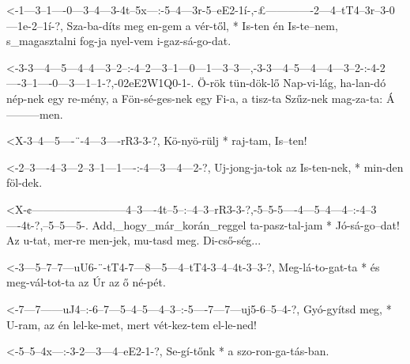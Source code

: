   {<-1---3--1----0---3--4---3-4t--5x---:-5--4---3r-5--eE2-1í-,-£-------------2---4--tT4--3r--3-0---1e-2--1í-?,}
  {  Sza-ba-díts meg en-gem a vér-től, * Is-ten én Is-te--nem, s_magasztalni fog-ja nyel-vem i-gaz-sá-go-dat.}


  {<-3-3---4---5---4--4---3--2--:-4--2---3--1---0---1---3--3---,-3-3---4--5---4---4---3--2-:-4-2----3--1----0---3---1--1-?,-02eE2W1Q0-1-.}
  {  Ö-rök tün-dök-lő Nap-vi-lág, ha-lan-dó nép-nek egy re-mény, a Fön-sé-ges-nek egy Fi-a,  a tisz-ta Szűz-nek mag-za-ta:  Á---------men.}

  {<X-3--4---5----¨-4---3----rR3-3-?,}
  {   Kö-nyö-rülj * raj-tam, Is--ten!}

  {<-2--3----4--3---2--3--1---1----:-4---3---4---2-?,}
  {  Uj-jong-ja-tok az Is-ten-nek, * min-den föl-dek.}

  {<X-¢--------------------------4--3----4t--5--:--4--3--rR3-3-?,-5--5-5----4---5--4---4--:-4--3----4t-?,--5--5---5-.}
  {   Add,_hogy_már_korán_reggel ta-pasz-tal-jam * Jó-sá-go--dat! Az u-tat, mer-re men-jek, mu-tasd meg.   Di-cső-ség...}

  {<-3---5--7--7---uU6-¨-tT4-7---8---5---4--tT4-3--4--4t-3--3-?,}
  {  Meg-lá-to-gat-ta  * és  meg-vál-tot-ta az  Úr az ő  né-pét.}


  {<-7---7------uJ4--:-6--7---5--4--5---4--3--:-5----7---7---uj5-6--5--4-?,}
  {  Gyó-gyítsd meg, * U-ram, az én lel-ke-met, mert vét-kez-tem el-le-ned!}

  {<-5--5--4x---:-3-2---3---4--eE2-1-?,}
  {  Se-gí-tőnk * a szo-ron-ga-tás-ban.}


